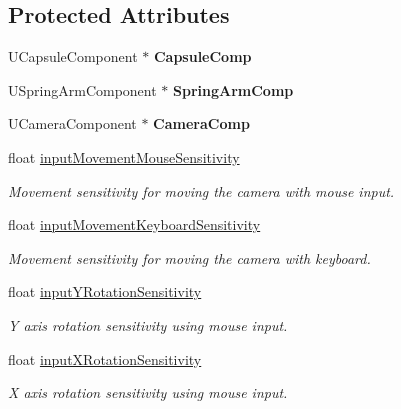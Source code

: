 \subsection*{Protected Attributes}
\begin{DoxyCompactItemize}
\item 
\mbox{\label{class_a_t_t___player_grid_camera_add44832fe1feaf83f402fdca00dcb0c6}} 
U\+Capsule\+Component $\ast$ {\bfseries Capsule\+Comp}
\item 
\mbox{\label{class_a_t_t___player_grid_camera_a7bc1946ccd3d2ced724a3e931e8c3e82}} 
U\+Spring\+Arm\+Component $\ast$ {\bfseries Spring\+Arm\+Comp}
\item 
\mbox{\label{class_a_t_t___player_grid_camera_a719083ee48da9d1f9da9296f3c7b384f}} 
U\+Camera\+Component $\ast$ {\bfseries Camera\+Comp}
\item 
float \mbox{\hyperlink{class_a_t_t___player_grid_camera_ab258c4fd2ad5d52e3df8a2cdc739918d}{input\+Movement\+Mouse\+Sensitivity}}
\begin{DoxyCompactList}\small\item\em Movement sensitivity for moving the camera with mouse input. \end{DoxyCompactList}\item 
float \mbox{\hyperlink{class_a_t_t___player_grid_camera_a8de8fb40426afd5291a6251c9ecb468c}{input\+Movement\+Keyboard\+Sensitivity}}
\begin{DoxyCompactList}\small\item\em Movement sensitivity for moving the camera with keyboard. \end{DoxyCompactList}\item 
float \mbox{\hyperlink{class_a_t_t___player_grid_camera_ab55b65a2722c4f69479fe968e17578ee}{input\+Y\+Rotation\+Sensitivity}}
\begin{DoxyCompactList}\small\item\em Y axis rotation sensitivity using mouse input. \end{DoxyCompactList}\item 
float \mbox{\hyperlink{class_a_t_t___player_grid_camera_abe6126eaf2e0d115400a623073a51ecc}{input\+X\+Rotation\+Sensitivity}}
\begin{DoxyCompactList}\small\item\em X axis rotation sensitivity using mouse input. \end{DoxyCompactList}\item 

\end{DoxyCompactItemize}
